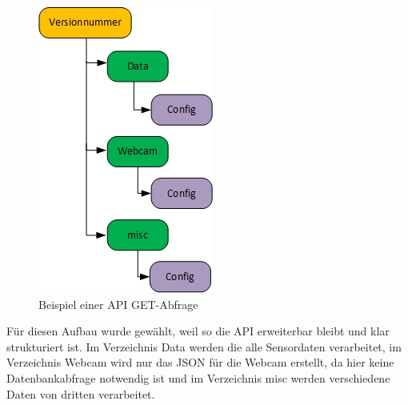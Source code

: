 \begin{figure}[h!]
	\centering
	\includegraphics[width=1\linewidth]{img/APIVerzeichnis.jpg}
	\caption{Beispiel einer API GET-Abfrage}
	\label{img:APIVerzeichnis}
\end{figure}

Für diesen Aufbau wurde gewählt, weil so die API erweiterbar bleibt und klar strukturiert ist. Im Verzeichnis Data werden die alle Sensordaten verarbeitet, im Verzeichnis Webcam wird nur das JSON für die Webcam erstellt, da hier keine Datenbankabfrage notwendig ist und im Verzeichnis misc werden verschiedene Daten von dritten verarbeitet.

